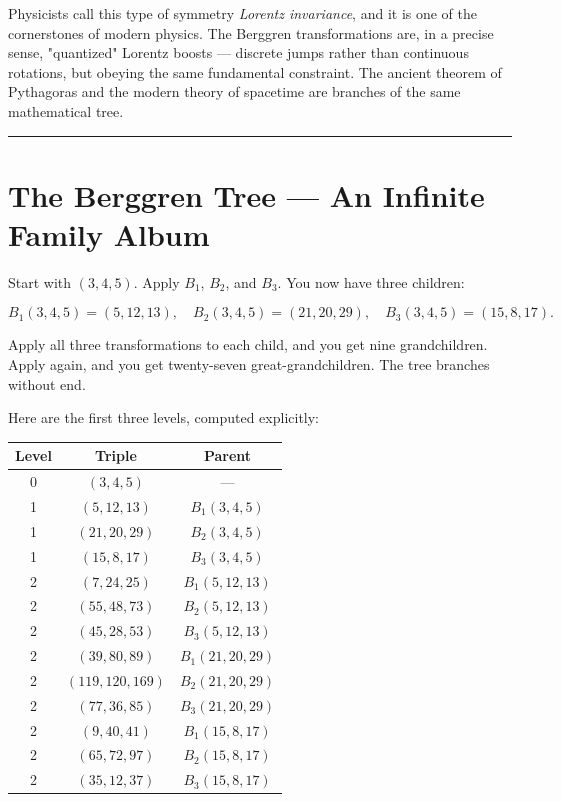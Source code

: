 \documentclass[11pt,openany]{book}
\theoremstyle{definition}
\theoremstyle{plain}
\theoremstyle{remark}
\begin{document}
Physicists call this type of symmetry \textit{Lorentz invariance}, and it is one of the cornerstones of modern physics. The Berggren transformations are, in a precise sense, "quantized" Lorentz boosts — discrete jumps rather than continuous rotations, but obeying the same fundamental constraint. The ancient theorem of Pythagoras and the modern theory of spacetime are branches of the same mathematical tree.

\bigskip\noindent\rule{\textwidth}{0.4pt}\bigskip


\section*{The Berggren Tree — An Infinite Family Album}


Start with $(3, 4, 5)$. Apply $B_1$, $B_2$, and $B_3$. You now have three children:

$$B_1(3, 4, 5) = (5, 12, 13), \quad B_2(3, 4, 5) = (21, 20, 29), \quad B_3(3, 4, 5) = (15, 8, 17).$$

Apply all three transformations to each child, and you get nine grandchildren. Apply again, and you get twenty-seven great-grandchildren. The tree branches without end.

Here are the first three levels, computed explicitly:

\begin{center}
\begin{tabular}{c|c|c}
\toprule
Level & Triple & Parent \\
\midrule
0 & $(3, 4, 5)$ & — \\
1 & $(5, 12, 13)$ & $B_1(3,4,5)$ \\
1 & $(21, 20, 29)$ & $B_2(3,4,5)$ \\
1 & $(15, 8, 17)$ & $B_3(3,4,5)$ \\
2 & $(7, 24, 25)$ & $B_1(5,12,13)$ \\
2 & $(55, 48, 73)$ & $B_2(5,12,13)$ \\
2 & $(45, 28, 53)$ & $B_3(5,12,13)$ \\
2 & $(39, 80, 89)$ & $B_1(21,20,29)$ \\
2 & $(119, 120, 169)$ & $B_2(21,20,29)$ \\
2 & $(77, 36, 85)$ & $B_3(21,20,29)$ \\
2 & $(9, 40, 41)$ & $B_1(15,8,17)$ \\
2 & $(65, 72, 97)$ & $B_2(15,8,17)$ \\
2 & $(35, 12, 37)$ & $B_3(15,8,17)$ \\
\bottomrule
\end{tabular}
\end{center}
\end{document}
